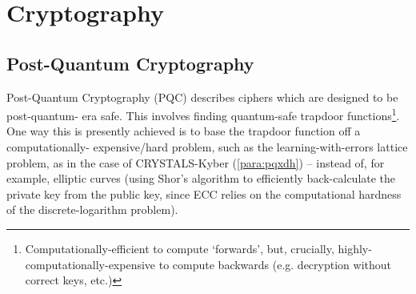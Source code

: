 \section{Cryptography}
\subsection{Post-Quantum Cryptography}
\label{subsec:post-quantum_cryptography}
Post-Quantum Cryptography (PQC) describes ciphers which are designed to be post-quantum- era safe. This involves finding quantum-safe trapdoor functions\footnote{Computationally-efficient to compute `forwards', but, crucially, highly- computationally-expensive to compute backwards (e.g. decryption without correct keys, etc.)}. One way this is presently achieved is to base the trapdoor function off a computationally- expensive/hard problem, such as the learning-with-errors lattice problem, as in the case of CRYSTALS-Kyber (\cref{para:pqxdh}) \citep{wikipedia:kyber} -- instead of, for example, elliptic curves (using Shor's algorithm to efficiently back-calculate the private key from the public key, since ECC relies on the computational hardness of the discrete-logarithm problem).
